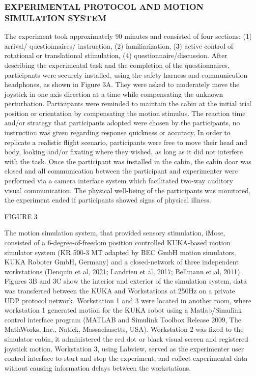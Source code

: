 \documentclass[11pt, onecolumn]{article}
\begin{document}
\subsubsection{EXPERIMENTAL PROTOCOL AND MOTION SIMULATION SYSTEM}
The experiment took approximately 90 minutes and consisted of four sections: (1) arrival/ questionnaires/ instruction, (2) familiarization, (3) active control of rotational or translational stimulation, (4) questionnaire/discussion.  After describing the experimental task and the completion of the questionnaires, participants were securely installed, using the safety harness and communication headphones, as shown in Figure 3A. They were asked to moderately move the joystick in one axis direction at a time while compensating the unknown perturbation.  Participants were reminded to maintain the cabin at the initial trial position or orientation by compensating the motion stimulus.  The reaction time and/or strategy that participants adopted were chosen by the participants, no instruction was given regarding response quickness or accuracy.  In order to replicate a realistic flight scenario, participants were free to move their head and body, looking and/or fixating where they wished, as long as it did not interfere with the task.  Once the participant was installed in the cabin, the cabin door was closed and all communication between the participant and experimenter were performed via a camera interface system which facilitated two-way auditory visual communication. The physical well-being of the participants was monitored, the experiment ended if participants showed signs of physical illness.

FIGURE 3

The motion simulation system, that provided sensory stimulation, iMose, consisted of a 6-degree-of-freedom position controlled KUKA-based motion simulator system (KR 500-3 MT adapted by BEC GmbH motion simulators, KUKA Roboter GmbH, Germany) and a closed-network of three independent workstations (Denquin et al, 2021; Landrieu et al, 2017; Bellmann et al, 2011).  Figures 3B and 3C show the interior and exterior of the simulation system, data was transferred between the KUKA and Workstations at 250Hz on a private UDP protocol network.  Workstation 1 and 3 were located in another room, where workstation 1 generated motion for the KUKA robot using a Matlab/Simulink control interface program (MATLAB and Simulink Toolbox Release 2009, The MathWorks, Inc., Natick, Massachusetts, USA).  Workstation 2 was fixed to the simulator cabin, it administered the red dot or black visual screen and registered joystick motion.  Workstation 3, using Labview, served as the experimenter user control interface to start and stop the experiment, and collect experimental data without causing information delays between the workstations.
\end{document}
